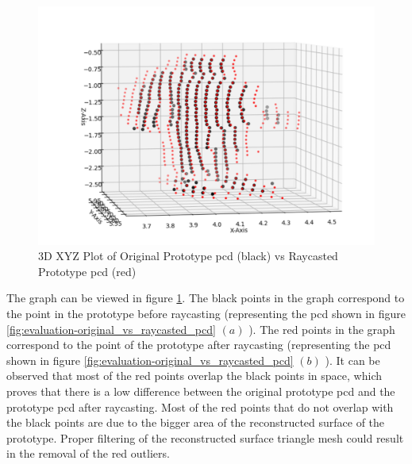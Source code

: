 \begin{figure}[htbp]
    \centering
    \includegraphics[width=0.8\linewidth]{97_graphics/evaluation/3dxyz_plot.pdf}
    \caption{3D XYZ Plot of Original Prototype \acrshort{pcd} (black) vs Raycasted Prototype \acrshort{pcd} (red)}
    \label{fig:evaluation_3dplot}
\end{figure}

The graph can be viewed in figure \ref{fig:evaluation_3dplot}. The black points in the graph correspond to the point in the prototype before raycasting (representing the \acrshort{pcd} shown in figure \ref{fig:evaluation-original_vs_raycasted_pcd} \((a)\) ). The red points in the graph correspond to the point of the prototype after raycasting (representing the \acrshort{pcd} shown in figure \ref{fig:evaluation-original_vs_raycasted_pcd} \((b)\) ). It can be observed that most of the red points overlap the black points in space, which proves that there is a low difference between the original prototype \acrshort{pcd} and the prototype \acrshort{pcd} after raycasting. Most of the red points that do not overlap with the black points are due to the bigger area of the reconstructed surface of the prototype. Proper filtering of the reconstructed surface triangle mesh could result in the removal of the red outliers.

